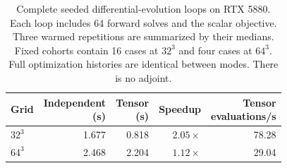 \begin{table}[tbp]
\centering
\small
\renewcommand{\arraystretch}{1.15}
\caption{Complete seeded differential-evolution loops on RTX 5880. Each loop includes 64 forward solves and the scalar objective. Three warmed repetitions are summarized by their medians. Fixed cohorts contain 16 cases at $32^3$ and four cases at $64^3$. Full optimization histories are identical between modes. There is no adjoint.}
\label{tab:design-throughput}
\begin{tabular}{@{}lrrrr@{}}
\toprule
Grid & \shortstack{Independent\\(s)} & \shortstack{Tensor\\(s)} & Speedup & \shortstack{Tensor\\evaluations/s} \\
\midrule
$32^3$ & 1.677 & 0.818 & $2.05\times$ & 78.28 \\
$64^3$ & 2.468 & 2.204 & $1.12\times$ & 29.04 \\
\bottomrule
\end{tabular}
\end{table}
